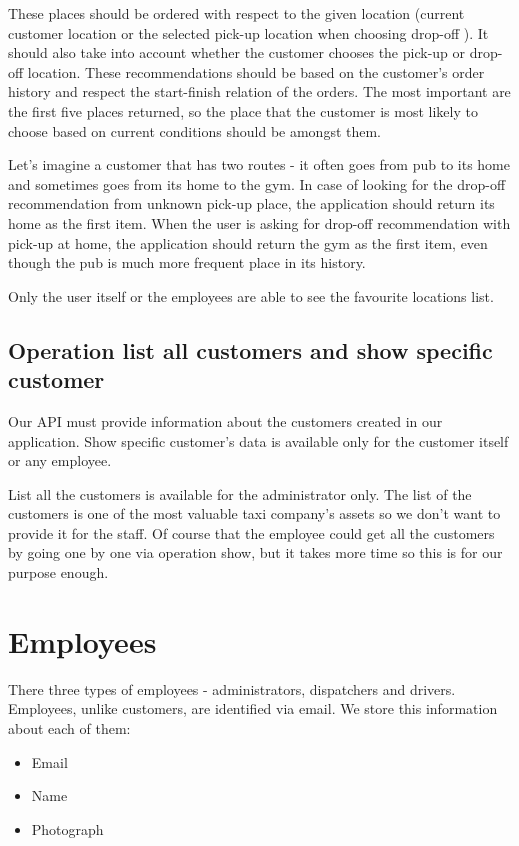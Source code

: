		These places should be ordered with respect to the given location (current customer location or the selected pick-up location when choosing drop-off ). It should also take into account whether the customer chooses the pick-up or drop-off location. These recommendations should be based on the customer's order history and respect the start-finish relation of the orders. The most important are the first five places returned, so the place that the customer is most likely to choose based on current conditions should be amongst them. 
		
		Let's imagine a customer that has two routes - it often goes from pub to its home and sometimes goes from its home to the gym. In case of looking for the drop-off recommendation from unknown pick-up place, the application should return its home as the first item. When the user is asking for drop-off recommendation with pick-up at home, the application should return the gym as the first item, even though the pub is much more frequent place in its history.
		
		Only the user itself or the employees are able to see the favourite locations list.
		 
		\subsection{Operation list all customers and show specific customer}
            Our API must provide information about the customers created in our application.
			Show specific customer's data is available only for the customer itself or any employee. 
			
			List all the customers is available for the administrator only. The list of the customers is one of the most valuable taxi company's assets so we don't want to provide it for the staff. Of course that the employee could get all the customers by going one by one via operation show, but it takes more time so this is for our purpose enough.
		
	\section{Employees}
        There three types of employees - administrators, dispatchers and drivers. Employees, unlike customers, are identified via email. We store this information about each of them:
		\begin{itemize}
			\item Email
			\item Name
			\item Photograph
		\end{itemize}
		
